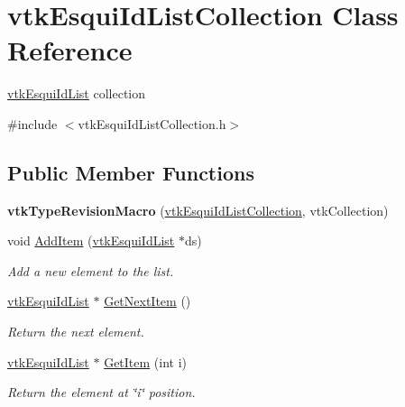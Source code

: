 \hypertarget{classvtkEsquiIdListCollection}{
\section{vtkEsquiIdListCollection Class Reference}
\label{classvtkEsquiIdListCollection}
}


\hyperlink{classvtkEsquiIdList}{vtkEsquiIdList} collection  


{\ttfamily \#include $<$vtkEsquiIdListCollection.h$>$}\subsection*{Public Member Functions}
\begin{DoxyCompactItemize}
\item 
\hypertarget{classvtkEsquiIdListCollection_a9c253c0431c06c022bd7bf642496ceea}{
{\bfseries vtkTypeRevisionMacro} (\hyperlink{classvtkEsquiIdListCollection}{vtkEsquiIdListCollection}, vtkCollection)}
\label{classvtkEsquiIdListCollection_a9c253c0431c06c022bd7bf642496ceea}

\item 
\hypertarget{classvtkEsquiIdListCollection_acf5097967c0d89d39835f00b3309781e}{
void \hyperlink{classvtkEsquiIdListCollection_acf5097967c0d89d39835f00b3309781e}{AddItem} (\hyperlink{classvtkEsquiIdList}{vtkEsquiIdList} $\ast$ds)}
\label{classvtkEsquiIdListCollection_acf5097967c0d89d39835f00b3309781e}

\begin{DoxyCompactList}\small\item\em Add a new element to the list. \item\end{DoxyCompactList}\item 
\hypertarget{classvtkEsquiIdListCollection_a27ebfb39e8dbe3bd6e6601e2ff413cdb}{
\hyperlink{classvtkEsquiIdList}{vtkEsquiIdList} $\ast$ \hyperlink{classvtkEsquiIdListCollection_a27ebfb39e8dbe3bd6e6601e2ff413cdb}{GetNextItem} ()}
\label{classvtkEsquiIdListCollection_a27ebfb39e8dbe3bd6e6601e2ff413cdb}

\begin{DoxyCompactList}\small\item\em Return the next element. \item\end{DoxyCompactList}\item 
\hypertarget{classvtkEsquiIdListCollection_ae144a100e297a6547a288cc11b32ca1c}{
\hyperlink{classvtkEsquiIdList}{vtkEsquiIdList} $\ast$ \hyperlink{classvtkEsquiIdListCollection_ae144a100e297a6547a288cc11b32ca1c}{GetItem} (int i)}
\label{classvtkEsquiIdListCollection_ae144a100e297a6547a288cc11b32ca1c}

\begin{DoxyCompactList}\small\item\em Return the element at \char`\"{}i\char`\"{} position. \item\end{DoxyCompactList}\end{DoxyCompactItemize}
